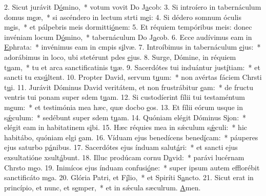 2. Sicut jurávit D\uline{ó}mino,~* votum vovit Do J\uline{a}cob:
3. Si introíero in tabernáculum domus m\uline{e}æ,~* si ascéndero in lectum strti m\uline{e}i:
4. Si dédero somnum óculis m\uline{e}is,~* et pálpebris meis dormitti\uline{ó}nem:
5. Et réquiem tempóribus meis: donec invéniam locum D\uline{ó}mino,~* tabernáculum Do J\uline{a}cob.
6. Ecce audívimus eam in \uline{E}phrata:~* invénimus eam in cmpis s\uline{i}lvæ.
7. Introíbimus in tabernáculum \uline{e}jus:~* adorábimus in loco, ubi stetérunt pdes \uline{e}jus.
8. Surge, Dómine, in réquiem t\uline{u}am,~* tu et arca sanctificatinis t\uline{u}æ.
9. Sacerdótes tui induántur just\uline{í}tiam:~* et sancti tu exs\uline{ú}ltent.
10. Propter David, servum t\uline{u}um:~* non avértas fáciem Chrsti t\uline{u}i.
11. Jurávit Dóminus David veritátem, et non frustrábitur \uline{e}am:~* de fructu ventris tui ponam super sdem t\uline{u}am.
12. Si custodíerint fílii tui testaméntum m\uline{e}um:~* et testimónia mea hæc, quæ docbo \uline{e}os.
13. Et fílii eórum usque in s\uline{ǽ}culum:~* sedébunt super sdem t\uline{u}am.
14. Quóniam elégit Dóminus S\uline{i}on:~* elégit eam in habitatinem s\uline{i}bi.
15. Hæc réquies mea in sǽculum s\uline{ǽ}culi:~* hic habitábo, quóniam elgi \uline{e}am.
16. Víduam ejus benedícens bened\uline{í}cam:~* páuperes ejus saturbo p\uline{á}nibus.
17. Sacerdótes ejus índuam salut\uline{á}ri:~* et sancti ejus exsultatióne xsult\uline{á}bunt.
18. Illuc prodúcam cornu D\uline{a}vid:~* parávi lucérnam Chrsto m\uline{e}o.
19. Inimícos ejus índuam confusi\uline{ó}ne:~* super ipsum autem efflorébit sanctificáto m\uline{e}a.
20. Glória Patri, et F\uline{í}lio,~* et Spiríti S\uline{a}ncto.
21. Sicut erat in princípio, et nunc, et s\uline{e}mper,~* et in sǽcula sæculrum. \uline{A}men.

